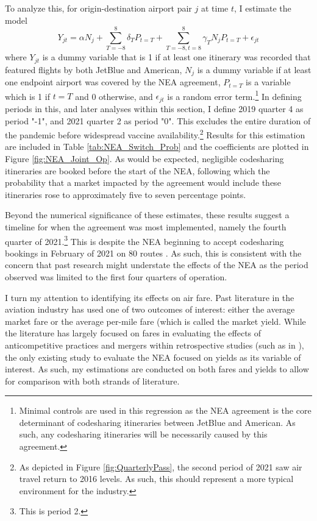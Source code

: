 \documentclass{article}
\begin{document}
	To analyze this, for origin-destination airport pair $j$ at time $t$,  I estimate the model \[Y_{jt} = \alpha N_{j} + \sum_{T = -8}^{8} \delta_{T} P_{t = T} + \sum_{T = -8, t = 8}^{8} \gamma_{T} N_{j} P_{t = T} + \epsilon_{jt}\] where $Y_{jt}$ is a dummy variable that is 1 if at least one itinerary was recorded that featured flights by both JetBlue and American,  $N_{j}$ is a dummy variable if at least one endpoint airport was covered by the NEA agreement, $P_{t = T}$ is a variable which is 1 if $t = T$ and 0 otherwise, and $\epsilon_{jt}$ is a random error term.\footnote{Minimal controls are used in this regression as the NEA agreement is the core determinant of codesharing itineraries between JetBlue and American. As such, any codesharing itineraries will be necessarily caused by this agreement.} In defining periods in this, and later analyses within this section, I define 2019 quarter 4 as period "-1", and 2021 quarter 2 as period "0". This excludes the entire duration of the pandemic before widespread vaccine availability.\footnote{As depicted in Figure \ref{fig:QuarterlyPass}, the second period of 2021 saw air travel return to 2016 levels. As such, this should represent a more typical environment for the industry.} Results for this estimation are included in Table \ref{tab:NEA_Switch_Prob} and the coefficients are plotted in Figure \ref{fig:NEA_Joint_Op}. As would be expected, negligible codesharing itineraries are booked before the start of the NEA, following which the probability that a market impacted by the agreement would include these itineraries rose to approximately five to seven percentage points. 
	
	Beyond the numerical significance of these estimates, these results suggest a timeline for when the agreement was most implemented, namely the fourth quarter of 2021.\footnote{This is period 2.} This is despite the NEA beginning to accept codesharing bookings in February of 2021 on 80 routes \citep{griff_8_2021}. As such, this is consistent with the concern that past research might understate the effects of the NEA as the period observed was limited to the first four quarters of operation.
	
	 I turn my attention to identifying its effects on air fare. Past literature in the aviation industry has used one of two outcomes of interest: either the average market fare or the average per-mile fare (which is called the market yield.  While the literature has largely focused on fares in evaluating the effects of anticompetitive practices and mergers within retrospective studies (such as in \citet{luo_price_2014, carlton_are_2019}), the only existing study \citep{zou_assessing_2023} to evaluate the NEA focused on yields as its variable of interest. As such, my estimations are conducted on both fares and yields to allow for comparison with both strands of literature. 
	
\end{document}

